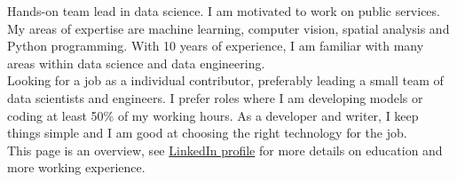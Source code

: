 \documentclass[8pt]{developercv} %
\begin{document}
\vspace{0.5cm}



\begin{minipage}[t]{0.6\textwidth} %
	\vspace{-\baselineskip} %

Hands-on team lead in data science. I am motivated to work on public services. My areas of expertise are machine learning, computer vision, spatial analysis and Python programming. With 10 years of experience, I am familiar with many areas within data science and data engineering. \\

Looking for a job as a individual contributor, preferably leading a small team of data scientists and engineers. I prefer roles where I am developing models or coding at least 50\% of my working hours. As a developer and writer, I keep things simple and I am good at choosing the right technology for the job.\\

This page is an overview, see \href{https://linkedin.com/in/gijskoot}{LinkedIn profile} for more details on education and more working experience.

\end{minipage}
\hfill %
\begin{minipage}[t]{0.3\textwidth} %
	\vspace{-\baselineskip} %
	\begin{barchart}{2.5}
	\end{barchart}
\end{minipage}

\end{document}
